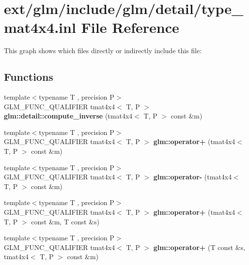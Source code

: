 \hypertarget{type__mat4x4_8inl}{\section{ext/glm/include/glm/detail/type\-\_\-mat4x4.inl File Reference}
\label{type__mat4x4_8inl}
}
This graph shows which files directly or indirectly include this file\-:
\subsection*{Functions}
\begin{DoxyCompactItemize}
\item 
\hypertarget{namespaceglm_1_1detail_aafe2452828abf1097ad0a95d66f79c45}{{\footnotesize template$<$typename T , precision P$>$ }\\G\-L\-M\-\_\-\-F\-U\-N\-C\-\_\-\-Q\-U\-A\-L\-I\-F\-I\-E\-R tmat4x4$<$ T, P $>$ {\bfseries glm\-::detail\-::compute\-\_\-inverse} (tmat4x4$<$ T, P $>$ const \&m)}\label{namespaceglm_1_1detail_aafe2452828abf1097ad0a95d66f79c45}

\item 
\hypertarget{namespaceglm_a9989e7e3651cecf45c9b7e856978fac0}{{\footnotesize template$<$typename T , precision P$>$ }\\G\-L\-M\-\_\-\-F\-U\-N\-C\-\_\-\-Q\-U\-A\-L\-I\-F\-I\-E\-R tmat4x4$<$ T, P $>$ {\bfseries glm\-::operator+} (tmat4x4$<$ T, P $>$ const \&m)}\label{namespaceglm_a9989e7e3651cecf45c9b7e856978fac0}

\item 
\hypertarget{namespaceglm_a86d70820c6583189bf78bef7a6bd6797}{{\footnotesize template$<$typename T , precision P$>$ }\\G\-L\-M\-\_\-\-F\-U\-N\-C\-\_\-\-Q\-U\-A\-L\-I\-F\-I\-E\-R tmat4x4$<$ T, P $>$ {\bfseries glm\-::operator-\/} (tmat4x4$<$ T, P $>$ const \&m)}\label{namespaceglm_a86d70820c6583189bf78bef7a6bd6797}

\item 
\hypertarget{namespaceglm_a8d33b2d0bb5b44913406bc51d992dbb2}{{\footnotesize template$<$typename T , precision P$>$ }\\G\-L\-M\-\_\-\-F\-U\-N\-C\-\_\-\-Q\-U\-A\-L\-I\-F\-I\-E\-R tmat4x4$<$ T, P $>$ {\bfseries glm\-::operator+} (tmat4x4$<$ T, P $>$ const \&m, T const \&s)}\label{namespaceglm_a8d33b2d0bb5b44913406bc51d992dbb2}

\item 
\hypertarget{namespaceglm_adaf33419391a9f6e8779a0f74199013b}{{\footnotesize template$<$typename T , precision P$>$ }\\G\-L\-M\-\_\-\-F\-U\-N\-C\-\_\-\-Q\-U\-A\-L\-I\-F\-I\-E\-R tmat4x4$<$ T, P $>$ {\bfseries glm\-::operator+} (T const \&s, tmat4x4$<$ T, P $>$ const \&m)}\label{namespaceglm_adaf33419391a9f6e8779a0f74199013b}


\end{DoxyCompactItemize}
